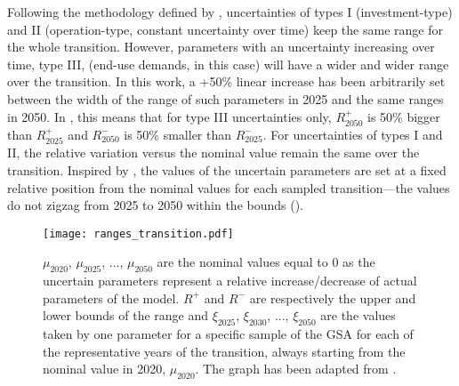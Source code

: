 %
%
%
%

Following the methodology defined by \citet{Moret2017}, uncertainties of types I (investment-type) and II (operation-type, constant uncertainty over time) keep the same range for the whole transition. However, parameters with an uncertainty increasing over time, type III, (\ie end-use demands, in this case) will have a wider and wider range over the transition. In this work, a +50\% linear increase has been arbitrarily set between the width of the range of such parameters in 2025 and the same ranges in 2050. In , this means that for type III uncertainties only, $R_{2050}^+$ is 50\% bigger than $R_{2025}^+$ and $R_{2050}^-$ is 50\% smaller than $R_{2025}^-$. For uncertainties of types I and II, the relative variation versus the nominal value remain the same over the transition. Inspired by \citet{guevara2022modeling}, the values of the uncertain parameters are set at a fixed relative position from the nominal values for each sampled transition---the values do not zigzag from 2025 to 2050 within the bounds ().

\begin{figure}[htbp!]
\centering
\texttt{[image: ranges\_transition.pdf]}
\caption{$\mu_{2020}$, $\mu_{2025}$, ...,  $\mu_{2050}$ are the nominal values equal to 0 as the uncertain parameters represent a relative increase/decrease of actual parameters of the model. $R^+$ and $R^-$ are respectively the upper and lower bounds of the range and $\xi_{2025}$, $\xi_{2030}$, ...,  $\xi_{2050}$ are the values taken by one parameter for a specific sample of the \gls{GSA} for each of the representative years of the transition, always starting from the nominal value in 2020, $\mu_{2020}$. The graph has been adapted from \cite{guevara2022modeling}.}
\label{fig:ranges_transition}
\end{figure}

